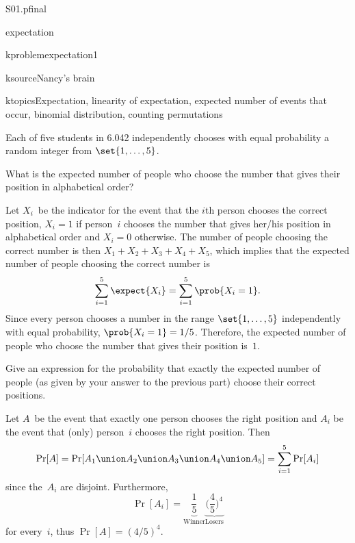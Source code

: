 \begin{problem}
\begin{staffnotes}
S01.pfinal

expectation

kproblem{expectation1}

ksource{Nancy's brain}

ktopics{Expectation, linearity of expectation, expected number of
events that occur, binomial distribution, counting permutations}
\end{staffnotes}

Each of five students in 6.042 independently chooses with equal
probability a random integer from $\set{1,\dots,5}$.

\bparts

\ppart What is the expected number of people who choose the
number that gives their position in alphabetical order?

\begin{solution}
Let $X_i$~be the indicator for the event that the $i$th
  person chooses the correct position, \ie $X_i = 1$ if person~$i$
  chooses the number that gives her\slash his position in alphabetical
  order and $X_i = 0$ otherwise. The number of people choosing the
  correct number is then $X_1 + X_2 + X_3 + X_4 + X_5$, which implies
  that the expected number of people choosing the correct number is
\[
    \sum_{i=1}^5 \expect{X_i} = \sum_{i=1}^5 \prob{X_i = 1}.
\]
  Since every person chooses a number in the range $\set{1,\dots,5}$
  independently with equal probability, $\prob{X_i = 1} = 1/5$.
  Therefore, the expected number of people who choose the number that
  gives their position is~$1$.
\end{solution}

\ppart Give an expression for the probability that
exactly the expected number of people (as given by your answer to
the previous part) choose their correct positions.

\begin{solution}
Let $A$~be the event that exactly one person chooses the
  right position and $A_i$ be the event that (only) person~$i$ chooses
  the right position. Then
\[
    \Pr[A]
    = \Pr[A_1 \union A_2 \union A_3 \union A_4 \union A_5]
    = \sum_{i=1}^5 \Pr[A_i]
\]
  since the~$A_i$ are disjoint. Furthermore,
\[
    \Pr[A_i] = \underbrace{\frac{1}{5}}_{\mathrm{Winner}}
    \underbrace{\biggl(\frac{4}{5}\biggr)^4}_{\mathrm{Losers}}
\]
  for every~$i$, thus $\Pr[A] = (4/5)^4$.
\end{solution}


\end{problem}
